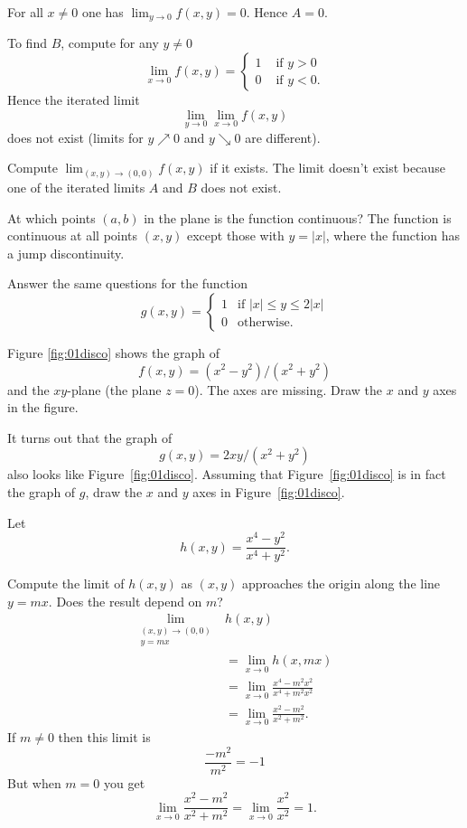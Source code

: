 \begin{multicols}{2}
For all $x\neq0$ one has $\lim_{y\to 0}f(x, y) = 0$.
Hence $A = 0$.

To find $B$, compute for any $y\neq 0$
\[
\lim_{x\to0} f(x, y) =
\begin{cases}
  1 & \text{ if }y>0\\
  0 & \text{ if }y<0.
\end{cases}
\]
Hence the iterated limit
\[
\lim_{y\to0}\lim_{x\to0} f(x, y)
\]
does not exist (limits for $y\nearrow 0$ and $y\searrow 0$ are different).

\endanswer


\subprob Compute $\lim_{(x,y)\to(0,0)}f(x,y)$ if it exists.
\answer%
The limit doesn't exist because one of the iterated limits $A$
and $B$ does not exist.
\endanswer



\subprob At which points $(a,b)$ in the plane is the function
continuous?
\answer%
The function is continuous at all points $(x,y)$ except those with
$y=|x|$, where the function has a jump discontinuity.
\endanswer


\subprob Answer the same questions for the function
\[
g(x, y) =
\begin{cases}
  1 & \text{if $|x|\leq y\leq 2|x|$} \\
  0 & \text{otherwise}.
\end{cases}
\]

\problem \label{prb:01disco-axes}%
\subprob Figure \ref{fig:01disco} shows the
graph of
\[
f(x, y) = (x^2-y^2) / (x^2 + y^2)
\]
and the $xy$-plane (the plane $z=0	$).  The axes are missing.
Draw the $x$ and $y$ axes in the figure.

\subprob It turns out that the graph of
\[
g(x, y) = 2xy/(x^2+y^2)
\]
also looks like Figure~\ref{fig:01disco}.  Assuming that
Figure~\ref{fig:01disco} is in fact the graph of $g$, draw the
$x$ and $y$ axes in Figure~\ref{fig:01disco}.

\problem  Let%
\[
h(x,y) = \frac{x^4-y^2}{x^4+y^2}.
\]

\subprob Compute the limit of $h(x, y)$ as $(x,y)$ approaches the
origin along the line $y=mx$.  Does the result depend on $m$?
\answer%
\begin{align*}
  \lim_{\substack{(x, y)\to(0,0)\\y=mx}}& h(x,y)\\
  &=\lim_{x\to 0} h(x, mx)\\
  &=\lim_{x\to0} \frac{x^4 - m^2x^2} {x^4+m^2x^2}\\
  &=\lim_{x\to0} \frac{x^2 - m^2} {x^2+m^2}.
\end{align*}
If $m\neq0$ then this limit is
\[
\frac{-m^2} {m^2} = -1
\]
But when $m=0$ you get
\[
\lim_{x\to0} \frac{x^2 - m^2} {x^2+m^2}
=\lim_{x\to0} \frac{x^2} {x^2}
=1.
\]
\endanswer



\end{multicols}
